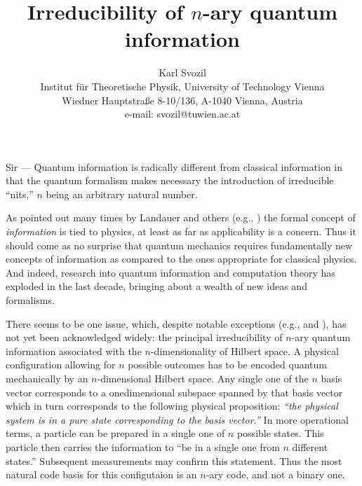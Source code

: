 




\title{Irreducibility of $n$-ary quantum information}
\author{Karl Svozil\\
 {\small Institut f\"ur Theoretische Physik, University of Technology Vienna }     \\
  {\small Wiedner Hauptstra\ss e 8-10/136,}
  {\small A-1040 Vienna, Austria   }            \\
  {\small e-mail: svozil@tuwien.ac.at}}
\date{ }
\maketitle


Sir ---
Quantum information
is radically different from classical information
in that the quantum formalism
makes necessary the introduction of irreducible ``nits,''
$n$ being an arbitrary natural number.

As pointed out many times by Landauer and others
(e.g., \cite{landauer,feynman-computation})
the formal concept of {\em information} is tied
to physics,
at least as far as applicability is a concern.
Thus it should come as no surprise that quantum mechanics
requires fundamentally new concepts of information
as compared to the ones appropriate for classical physics.
And indeed, research into quantum information and computation theory
has exploded in the last decade, bringing about a wealth of new
ideas and formalisms.

There seems to be one issue,
which, despite notable exceptions (e.g., \cite[Footnote 6]{zeil-99} and
\cite{Muthukrishnan}),
has not yet been acknowledged widely:
the principal irreducibility of $n$-ary quantum information
associated with the $n$-dimensionality of Hilbert space.
A physical configuration allowing for $n$ possible outcomes
has to be encoded quantum mechanically by an $n$-dimensional Hilbert space.
Any single one of the $n$ basis vector corresponds
to a onedimensional subspace spanned by that basis vector
which in turn corresponds to the following physical proposition:
{\em ``the physical system is in a pure state corresponding to the basis vector.''}
In more operational terms, a particle can be prepared
in a single one of $n$ possible states.
This particle then carries the information to
``be in a single one from $n$ different states.''
Subsequent measurements may confirm this statement.
Thus the most natural code basis for this configutaion is an $n$-ary code,
and not a binary one.


